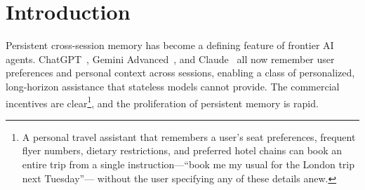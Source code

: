 \documentclass[sigconf]{acmart}
\begin{document}



\maketitle


\section{Introduction}
\label{sec:intro}

Persistent cross-session memory has become a defining feature of frontier AI agents.
ChatGPT~\citep{openai2024memory}, Gemini Advanced~\citep{google2024gemini}, and
Claude~\citep{anthropic2025memory,anthropic2026import} all now remember user preferences and personal context across sessions, enabling a class of personalized,
long-horizon assistance that stateless models cannot provide.
The commercial incentives are clear\footnote{A personal travel assistant 
that remembers a user's seat preferences, frequent flyer numbers, dietary 
restrictions, and preferred hotel chains can book an entire trip from a 
single instruction---``book me my usual for the London trip next Tuesday''---
without the user specifying any of these details anew.}, and the proliferation of persistent memory is rapid.
\end{document}
